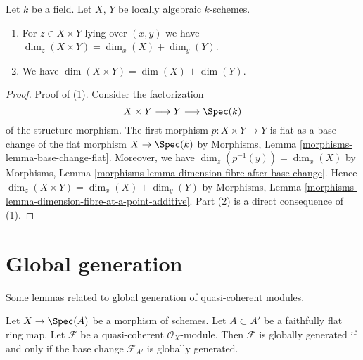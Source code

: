 \begin{lemma}
\label{lemma-dimension-product-locally-algebraic}
Let $k$ be a field. Let $X$, $Y$ be locally algebraic $k$-schemes.
\begin{enumerate}
\item For $z \in X \times Y$ lying over $(x, y)$ we have
$\dim_z(X \times Y) = \dim_x(X) + \dim_y(Y)$.
\item We have $\dim(X \times Y) = \dim(X) + \dim(Y)$.
\end{enumerate}
\end{lemma}

\begin{proof}
Proof of (1). Consider the factorization
$$
X \times Y \longrightarrow Y \longrightarrow \Spec(k)
$$
of the structure morphism. The first morphism $p : X \times Y \to Y$
is flat as a base change of the flat morphism $X \to \Spec(k)$
by Morphisms, Lemma \ref{morphisms-lemma-base-change-flat}.
Moreover, we have $\dim_z(p^{-1}(y)) = \dim_x(X)$ by
Morphisms, Lemma \ref{morphisms-lemma-dimension-fibre-after-base-change}.
Hence $\dim_z(X \times Y) = \dim_x(X) + \dim_y(Y)$ by
Morphisms, Lemma \ref{morphisms-lemma-dimension-fibre-at-a-point-additive}.
Part (2) is a direct consequence of (1).
\end{proof}





\section{Global generation}
\label{section-global-generation}

\noindent
Some lemmas related to global generation of quasi-coherent modules.

\begin{lemma}
\label{lemma-globally-generated-base-change}
Let $X \to \Spec(A)$ be a morphism of schemes. Let $A \subset A'$
be a faithfully flat ring map. Let $\mathcal{F}$ be a quasi-coherent
$\mathcal{O}_X$-module. Then $\mathcal{F}$ is globally generated
if and only if the base change $\mathcal{F}_{A'}$ is globally generated.
\end{lemma}


